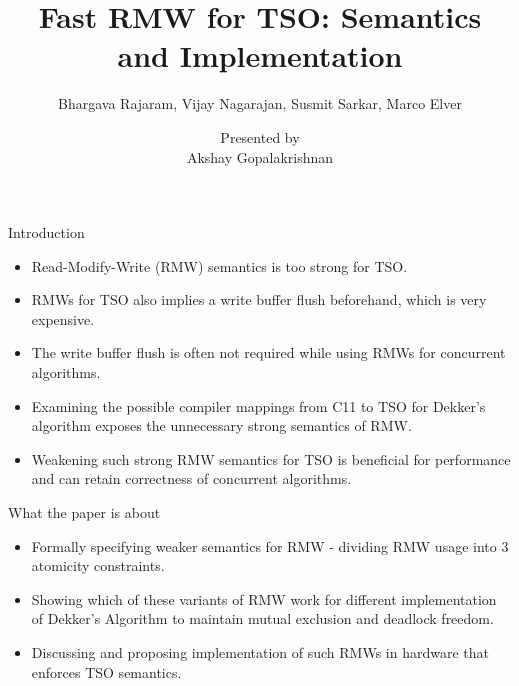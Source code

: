 \documentclass[xcolor=dvipsnames, notes]{beamer}
\title{Fast RMW for TSO: Semantics and Implementation}
\subtitle{Bhargava Rajaram, Vijay Nagarajan, Susmit Sarkar, Marco Elver}
\author{Presented by \\ Akshay Gopalakrishnan}
\begin{document}
    \begin{frame}

        \maketitle

    \end{frame}

    \begin{frame}{Introduction}

        \begin{itemize}
            \item Read-Modify-Write (RMW) semantics is too strong for TSO.  
            \item RMWs for TSO also implies a write buffer flush beforehand, which is very expensive.
            \item The write buffer flush is often not required while using RMWs for concurrent algorithms. 
            \item Examining the possible compiler mappings from C11 to TSO for Dekker's algorithm exposes the unnecessary strong semantics of RMW.
            \item Weakening such strong RMW semantics for TSO is beneficial for performance and can retain correctness of concurrent algorithms.
        \end{itemize}

    \end{frame}

    \begin{frame}{What the paper is about}

        \begin{itemize}
            \item Formally specifying weaker semantics for RMW - dividing RMW usage into 3 atomicity constraints.
            \item Showing which of these variants of RMW work for different implementation of Dekker's Algorithm to maintain mutual exclusion and deadlock freedom.
            \item Discussing and proposing implementation of such RMWs in hardware that enforces TSO semantics.
        \end{itemize}

    \end{frame}
\end{document}
